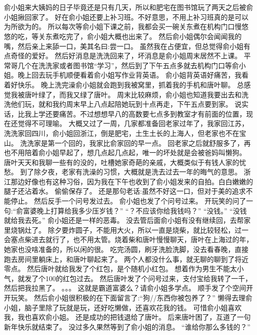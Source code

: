 \chapter{}
俞小姐来大姨妈的日子毕竟还是只有几天，所以和肥宅在图书馆玩了两天之后被俞小姐揪回家了。
好在俞小姐还要上补习班。不好意思，不用上补习班真的是可以为所欲为的。
所以每次等俞小姐下课之前，我都会买一碗关东煮在机构门口慢悠悠的吃，等关东煮吃完了，俞小姐大概也出来了。
然后俞小姐偶尔会闻闻我的嘴，然后亲上来舔一口，美其名曰:尝一口。
虽然我在占便宜，但总觉得俞小姐有点奇怪的爱好。
然后好消息是洗洗回来了，坏消息是俞小姐周末居然不上课。
平常哥几个在洗洗家或者图书馆“学习”，然后到了下午五点多就去机构门口等俞小姐。晚上回去玩手机顺便看着俞小姐写作业背英语。
俞小姐背英语好痛苦，我看着好快乐。
晚上洗完澡俞小姐就会跑到我被窝里，抓着我的手机和唐叶聊。
总感觉我被唐叶绿了，而我又绿了唐叶。
周末比较麻烦，俞小姐也知道我要出去和洗洗他们玩，就和我约周末早上八点起陪她玩到十点再走，下午五点要到家。
说实话，比我上学还要痛苦。不过想想早八的高数要七点多到教室才有前面的位置，现在还觉得不可理喻。
大概又过了一周，几家都准备回老家过年了，我家回江苏，洗洗家回四川，俞小姐回浙江，倒是肥宅，土生土长的上海人，但老家也不在宝山。
洗洗家是第一个回的，我家比俞家回的早一点。
回老家之后就舒服多了，再也不用陪着俞小姐早起了，想几点起几点起，唯一的坏处就是会被爸妈叫懒狗。
唐叶天天和我聊一些有的没的，吐槽她家奇葩的亲戚，大概类似于有钱人家的忧愁。
到了除夕夜，老家有洗澡的习惯，大概就是洗去过去一年的晦气的意思。
浙江那边好像也有这种习俗，因为我在下午也收到了俞小姐发来的自拍。白白嫩嫩的腿子还沾着水。
偷偷保存了。
还是那句老话:虽然不好这一口，但对于美的追求不能停止。
然后反手一个问号发过去。
俞小姐也发了个问号过来。
开玩笑的问了一句:“俞富婆晚上打算给我多少压岁钱？”
“？不应该你给我钱吗？”
“没钱。”
“没钱就给我去死。”
俞小姐还是一样的恶毒。
没去管后面俞小姐有没有继续回，去帮家里烧锅灶了。
除夕要炸圆子，不能用大火，所以一直是烧柴，就比较轻松，过一会塞点柴进去就行了，也不用太管。烧着柴和唐叶慢慢聊天，唐叶在上海过的年，她家也没啥准备的，所以闲的很。
吃完汤圆，刷牙洗脸洗脚，没去看春晚，直接跑去房间里躺床上，和唐叶聊起来了。
两个人都没什么事，就无聊的聊到了将近零点。
然后唐叶就给我发了个红包，是个随机小红包。
想着作为男生不能太小气，就发了个100的红包过去。
然后唐叶发了个问号过来，支付宝给我转了一千，然后把我拉黑了。
。。。
这就是霸道富婆么？请俞小姐多学点。
顺手发了个空间开开玩笑。
然后俞小姐很积极的在下面留言了:“狗//东西你被包养了？”
懒得去理俞小姐，脑子里除了玩就是玩，还好吃懒做，还喜欢花我的钱。
可惜俞小姐喜欢我，我也喜欢俞小姐。
还是成功的把钱退给了唐叶。
后来唐叶困了，互道了一句新年快乐就结束了。
没过多久果然等到了俞小姐的消息。
“谁给你那么多钱的？”
